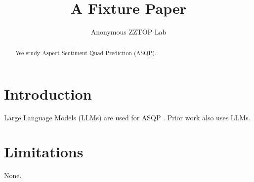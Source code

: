 \documentclass[11pt]{article}
\title{A Fixture Paper}
\author{Anonymous \AND ZZTOP Lab}
\begin{document}
\maketitle
\begin{abstract}
We study Aspect Sentiment Quad Prediction (ASQP).
\end{abstract}

\section{Introduction}
Large Language Models (LLMs) are used for ASQP \citep{zhang-etal-2021-aspect-sentiment}.
Prior work \citet{smith2020,
  jones2021} also uses LLMs.


\section*{Limitations}
None.


\end{document}
